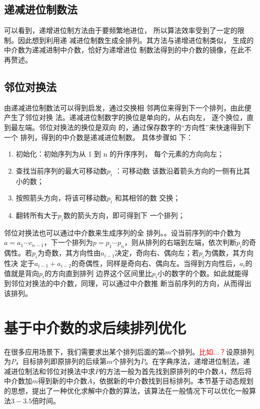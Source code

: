 \documentclass[6pt, twocolumn]{ctexart}
\begin{document}
\subsection{递减进位制数法}
可以看到，递增进位制方法由于要频繁地进位， 所以算法效率受到了一定的限制。因此想到利用递 减进位制数生成全排列。其方法与递增进位制类似， 生成的中介数为递减进制中介数，恰好为递增进位 制数法得到的中介数的镜像，在此不再赘述。
\subsection{邻位对换法}
由递减进位制数法可以得到启发，通过交换相 邻两位来得到下一个排列，由此便产生了邻位对换 法。递减进位制数字的换位是单向的，从右向左， 逐个换位，直到最左端。邻位对换法的换位是双向 的，通过保存数字的“方向性”来快速得到下一个 排列，得到的中介数是递减进位制数。 具体步骤如 下：
\begin{enumerate}
	\item 初始化：初始序列为从 1 到 n 的升序序列， 每个元素的方向向左；
	\item 查找当前序列的最大可移动数$p_i$ ：可移动数 该数沿着箭头方向的一侧有比其小的数；
	\item 按照箭头方向，将该可移动数$p_i$ 和其相邻的数 交换；
	\item 翻转所有大于$p_i$数的箭头方向，即可得到下 一个排列；
\end{enumerate}
邻位对换法也可以通过中介数来生成序列的全 排列。。设当前序列的中介数为$a = a_1\cdots c_{n-1}$，下一个排列为$p = p_1 \cdots p_n$，则从排列的右端到左端，依次判断$p_i$的奇偶性。若$p_i$为奇数，其方向性由$a_{i-1}$决定，奇向右、偶向左；若$p_i$为偶数，其方向性决 定于$a_{i-1}+a_{i-2}$的奇偶性，同样是奇向右、偶向左。当得到方向性后，$a_i$的值就是背向$p_i$的方向直到排列 边界这个区间里比$p_i$小的数字的个数。如此就能得 到邻位对换法的中介数，同理，可以通过中介数推 断当前序列的方向，从而得出该排列。





\section{基于中介数的求后续排列优化}
在很多应用场景下，我们需要求出某个排列后面的第$m$个排列。\textcolor{red}{比如...？}设原排列为$P$，目标排列即原排列的后续第$m$个排列为$\bar{P}$。在字典序法，递增进位制法，递减进位制法和邻位对换法中求$\bar{P}$的方法一般为首先找到原排列的中介数$A$，然后将中介数加$m$得到新的中介数$\bar{A}$，依据新的中介数找到目标排列。本节基于动态规划的思想，提出了一种优化求解中介数的算法，该算法在一般情况下可以优化一般算法$3-3.5$倍时间。
\end{document}
